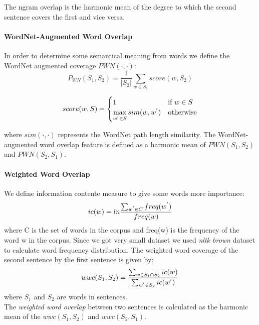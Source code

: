 \documentclass[10pt, a4paper]{article}
\begin{document}
\begin{table}[h!]
The ngram overlap is the harmonic mean of the degree
to which the second sentence covers the first
and vice versa.\citep{Saric2012TakeLabSF}

\paragraph{WordNet-Augmented Word Overlap \\}
In order to determine some semantical meaning from words we define the WordNet augmented coverage $ PWN(\cdot, \cdot) $:
\begin{equation}\label{eq:pwn}
P_{WN}(S_1, S_2) = \frac{1}{|S_2|} \sum_{w \in S_1} score(w, S_2)
\end{equation}

\begin{equation}\label{eq:pwn-score}
score(w, S) = \begin{cases}
1 & \text{if $w \in S $}\\
\max\limits_{w^{\rq} \in S} sim(w, w^{\rq}) & \text{otherwise}
\end{cases}
\end{equation}

where $sim(\cdot, \cdot)$ represents the WordNet path length
similarity. The WordNet-augmented word overlap
feature is defined as a harmonic mean of
$PWN(S_1, S_2)$ and $PWN(S_2, S_1)$.\citep{Saric2012TakeLabSF}


\paragraph{Weighted Word Overlap \\}
We define information contente measure to give some words more importance:
\begin{equation}\label{eq:inf-content}
ic(w) = ln \frac{\sum_{w^{\rq} \in C} freq(w^{\rq}) }{freq(w)}
\end{equation}
where C is the set of words in the corpus and
freq(w) is the frequency of the word w in the corpus. Since we got very small dataset we used \emph{nltk brown} dataset to calculate word frequency distribution.
The weighted word coverage of the second sentence by the first sentence is given by:
\begin{equation}\label{eq:wwc}
wwc(S_1, S_2) = \frac{\sum_{w \in S_1 \cap S_2} ic(w)}{\sum_{w^{\rq} \in S_2} ic(w^{\rq})}
\end{equation}
where $S_1$ and $S_2$ are words in sentences.\\
The \emph{weighted word overlap} between two sentences
is calculated as the harmonic mean of the
$wwc(S_1, S_2)$ and $wwc(S_2, S_1)$.\citep{Saric2012TakeLabSF}


\end{table}
\end{document}
